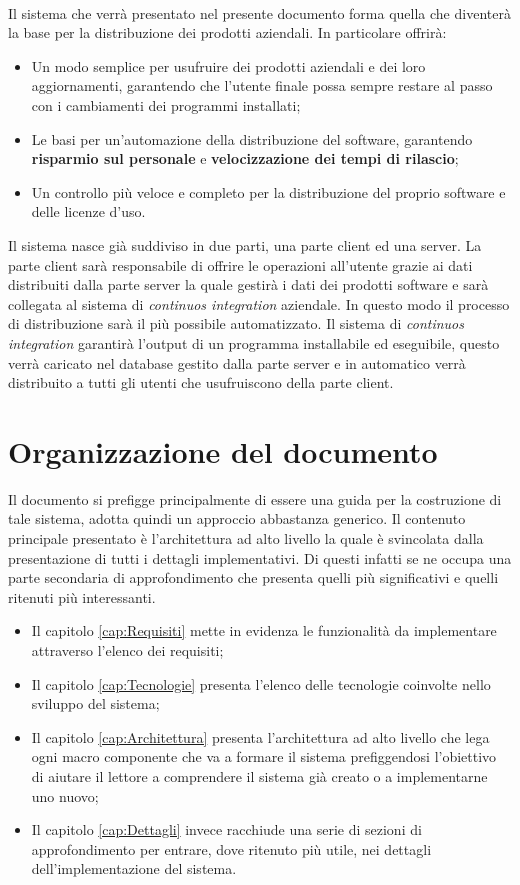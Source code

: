 \documentclass[../RelazioneFinale.tex]{subfiles}
\begin{document}
		\paragraph*{}
		Il sistema che verrà presentato nel presente documento forma quella che diventerà la base per la distribuzione dei prodotti aziendali. In particolare offrirà:
		\begin{itemize}
			\item Un modo semplice per usufruire dei prodotti aziendali e dei loro aggiornamenti, garantendo che l'utente finale possa sempre restare al passo con i cambiamenti dei programmi installati;
			\item Le basi per un'automazione della distribuzione del software, garantendo \textbf{risparmio sul personale} e \textbf{velocizzazione dei tempi di rilascio};
			\item Un controllo più veloce e completo per la distribuzione del proprio software e delle licenze d'uso.
		\end{itemize}
		Il sistema nasce già suddiviso in due parti, una parte client ed una server. La parte client sarà responsabile di offrire le operazioni all'utente grazie ai dati distribuiti dalla parte server la quale gestirà i dati dei prodotti software e sarà collegata al sistema di \emph{continuos integration} aziendale.				
		In questo modo il processo di distribuzione sarà il più possibile automatizzato. Il sistema di \emph{continuos integration} garantirà l'output di un programma installabile ed eseguibile, questo verrà caricato nel database gestito dalla parte server e in automatico verrà distribuito a tutti gli utenti che usufruiscono della parte client.
		
		\section{Organizzazione del documento}
			Il documento si prefigge principalmente di essere una guida per la costruzione di tale sistema, adotta quindi un approccio abbastanza generico. Il contenuto principale presentato è l'architettura ad alto livello la quale è svincolata dalla presentazione di tutti i dettagli implementativi. Di questi infatti se ne occupa una parte secondaria di approfondimento che presenta quelli più significativi e quelli ritenuti più interessanti. 
		\begin{itemize}
			\item Il capitolo \ref{cap:Requisiti} mette in evidenza le funzionalità da implementare attraverso l'elenco dei requisiti;
			\item Il capitolo \ref{cap:Tecnologie} presenta l'elenco delle tecnologie coinvolte nello sviluppo del sistema;
			\item Il capitolo \ref{cap:Architettura} presenta l'architettura ad alto livello che lega ogni macro componente che va a formare il sistema prefiggendosi l'obiettivo di aiutare il lettore a comprendere il sistema già creato o a implementarne uno nuovo;
			\item Il capitolo \ref{cap:Dettagli} invece racchiude una serie di sezioni di approfondimento per entrare, dove ritenuto più utile, nei dettagli dell'implementazione del sistema.
		\end{itemize}					
\end{document}
